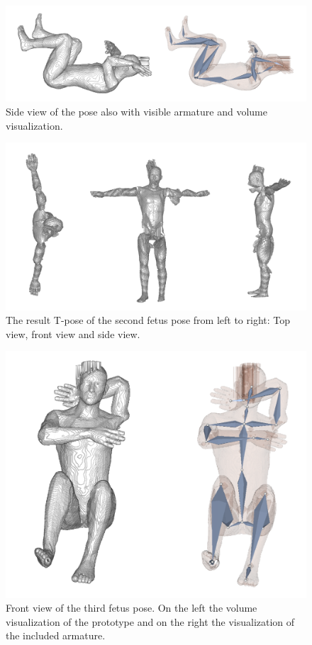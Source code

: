 \begin{figure} [htb!]
    \centering
	\includegraphics[width=15cm]{content/images/results/man2Side.png}
	\caption{Side view of the pose also with visible armature and volume visualization.}
	\label{fig:}
\end{figure}
\vspace*{3cm}
\begin{figure} [htb!]
    \centering
	\includegraphics[width=15cm]{content/images/results/man2Result.png}
	\caption{The result T-pose of the second fetus pose from left to right: Top view, front view and side view.}
	\label{fig:}
\end{figure}
\newpage
\begin{figure} [htb!]
    \centering
	\includegraphics[width=13cm]{content/images/results/man3Front.png}
	\caption{Front view of the third fetus pose. On the left the volume visualization of the prototype and on the right the visualization of the included armature.}
	\label{fig:}
\end{figure}
